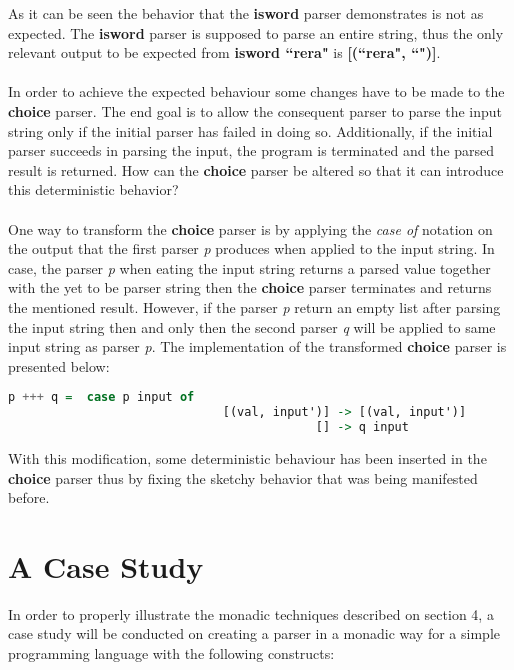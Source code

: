 \documentclass[a4paper, onecolumn]{article}
\begin{document}
    \noindent As it can be seen the behavior that the \textbf{isword} parser demonstrates is not as expected. The \textbf{isword} parser is supposed to parse an entire string, thus the only relevant output to be expected from \textbf{isword ``rera"} is \textbf{[(``rera", ``")]}. \\ \\
      In order to achieve the expected behaviour some changes have to be made to the \textbf{choice} parser. The end goal is to allow the consequent parser to parse the input string only if the initial parser has failed in doing so. Additionally, if the initial parser succeeds in parsing the input, the program is terminated and the parsed result is returned. How can the \textbf{choice} parser be altered so that it can introduce this deterministic behavior? \\ \\ 
      One way to transform the \textbf{choice} parser is by applying the \textit{case of} notation on the output that the first parser \textit{p} produces when applied to the input string. In case, the parser \textit{p} when eating the input string returns a parsed value together with the yet to be parser string then the \textbf{choice} parser terminates and returns the mentioned result. However, if the parser \textit{p} return an empty list after parsing the input string then and only then the second parser \textit{q} will be applied to same input string as parser \textit{p}. The implementation of the transformed \textbf{choice} parser is presented below:
     
    \begin{tcolorbox}
    \begin{lstlisting}[language=Haskell] 
        p +++ q =  case p input of
                              [(val, input')] -> [(val, input')]
                                           [] -> q input
    \end{lstlisting}
    \end{tcolorbox}
     
     \noindent With this modification, some deterministic behaviour has been inserted in the \textbf{choice} parser thus by fixing the sketchy behavior that was being manifested before.
    
    \section{A Case Study}
    
    In order to properly illustrate the monadic techniques described on section 4, a case study will be conducted on creating a parser in a monadic way for a simple programming language with the following constructs: 
    
\end{document}
